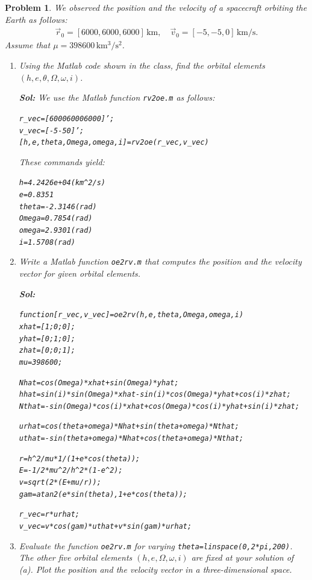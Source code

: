 \documentclass[10pt]{article}
\renewcommand{\baselinestretch}{1.2}
\theoremstyle{plain}\theorembodyfont{\normalfont}
\newtheorem{prob}{Problem}[section]
\newenvironment{subprob}%
{\renewcommand{\theenumi}{\alph{enumi}}\renewcommand{\labelenumi}{(\theenumi)}\begin{enumerate}}%
{\end{enumerate}}%
\newenvironment{matlab}
{\begin{alltt}\small\renewcommand{\baselinestretch}{1.2}\selectfont}%
{\end{alltt}}
\begin{document}
\begin{prob} We observed the position and the velocity of a spacecraft orbiting the Earth as follows:
\begin{align*}
\vec r_0 = [6000,6000,6000]\,\mathrm{km},\quad \vec v_0 = [-5,-5,0]\,\mathrm{km/s}.
\end{align*}
Assume that $\mu = 398600 \,\mathrm{km^3/s^2}$.

\begin{subprob}
\item Using the Matlab code shown in the class, find the orbital elements $(h,e,\theta,\Omega,\omega,i)$.

\textbf{Sol:} We use the Matlab function \texttt{rv2oe.m} as follows:
\begin{matlab}
r_vec=[6000 6000 6000]';
v_vec=[-5 -5 0]';
[h,e,theta,Omega,omega,i]=rv2oe(r_vec,v_vec)
\end{matlab}
These commands yield:
\begin{matlab}
h =   4.2426e+04 (km^2/s)
e =    0.8351
theta =   -2.3146 (rad)
Omega =    0.7854 (rad)
omega =    2.9301 (rad)
i =    1.5708 (rad)
\end{matlab}

\item Write a Matlab function \texttt{oe2rv.m} that computes the position and the velocity vector for  given orbital elements. 

\textbf{Sol:}
\begin{matlab}
function [r_vec, v_vec]=oe2rv(h,e,theta,Omega,omega,i) 
xhat=[1;0;0]; 
yhat=[0;1;0]; 
zhat=[0;0;1]; 
mu=398600;

Nhat=cos(Omega)*xhat+sin(Omega)*yhat;
hhat=sin(i)*sin(Omega)*xhat-sin(i)*cos(Omega)*yhat+cos(i)*zhat;
Nthat=-sin(Omega)*cos(i)*xhat+cos(Omega)*cos(i)*yhat+sin(i)*zhat;

urhat=cos(theta+omega)*Nhat+sin(theta+omega)*Nthat;
uthat=-sin(theta+omega)*Nhat+cos(theta+omega)*Nthat;

r=h^2/mu*1/(1+e*cos(theta));
E=-1/2*mu^2/h^2*(1-e^2);
v=sqrt(2*(E+mu/r));
gam=atan2(e*sin(theta),1+e*cos(theta));

r_vec=r*urhat;
v_vec=v*cos(gam)*uthat+v*sin(gam)*urhat;
\end{matlab}


\item Evaluate the function \texttt{oe2rv.m} for varying \texttt{theta=linspace(0,2*pi,200)}. The other five orbital elements $(h,e,\Omega,\omega,i)$ are fixed at your solution of (a). Plot the position and the velocity vector in a three-dimensional space. 


\end{subprob}
\end{prob}
\end{document}
